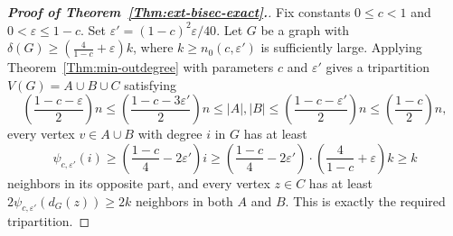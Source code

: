 \documentclass{aic}
\begin{document}
	\begin{proof}[\bf Proof of Theorem~\ref{Thm:ext-bisec-exact}.]
		Fix constants $0\leq c<1$ and $0<\varepsilon\leq 1-c$.
		Set $\varepsilon'=(1-c)^2\varepsilon/40$.
		Let $G$ be a graph with $\delta(G)\geq \left(\frac{4}{1-c}+\varepsilon\right)k$, where $k\geq n_0(c,\varepsilon')$ is sufficiently large.
		Applying Theorem~\ref{Thm:min-outdegree} with parameters $c$ and $\varepsilon'$ gives a tripartition $V(G)=A\cup B\cup C$ satisfying
		$$\left(\frac{1-c-\varepsilon}{2}\right)n\leq \left(\frac{1-c-3\varepsilon'}{2}\right)n\leq |A|,|B|\leq \left(\frac{1-c-\varepsilon'}{2}\right)n\leq \left(\frac{1-c}{2}\right)n,$$
		every vertex $v\in A\cup B$ with degree $i$ in $G$ has at least
		$$\psi_{c,\varepsilon'}(i)\geq \left(\frac{1-c}{4}-2\varepsilon'\right)i\geq \left(\frac{1-c}{4}-2\varepsilon'\right)\cdot \left(\frac{4}{1-c}+\varepsilon\right)k\geq k$$
		neighbors in its opposite part,
		and every vertex $z\in C$ has at least $2\psi_{c,\varepsilon'}(d_G(z))\geq 2k$ neighbors in both $A$ and $B$.
		This is exactly the required tripartition.
	\end{proof}
	
\end{document}
